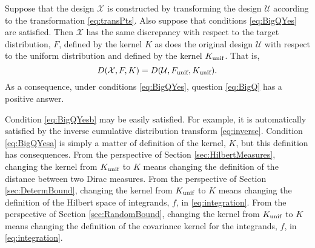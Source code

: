 \documentclass[graybox]{svmult}
\newcommand{\Udes}{\mathcal{U}}
\newcommand{\Xdes}{\mathcal{X}}
\newcommand{\unif}{\textup{unif}}
\begin{document}
\begin{theorem}
Suppose that the design $\Xdes$ is constructed by transforming the design $\Udes$ according to the transformation \eqref{eq:transPts}.  Also suppose that conditions \eqref{eq:BigQYes} are satisfied.  Then $\Xdes$ has the same discrepancy with respect to the target distribution, $F$, defined by the kernel $K$ as does the original design $\Udes$ with respect to the uniform distribution and defined by the kernel $K_\unif$.  That is,
\begin{equation*}
     D(\Xdes,F,K) = D(\Udes,F_{\unif},K_\unif).
\end{equation*}
As a consequence, under conditions \eqref{eq:BigQYes}, question \eqref{eq:BigQ} has a positive answer.
\end{theorem}

Condition \eqref{eq:BigQYesb} may be easily satisfied.  For example, it is automatically satisfied by the inverse cumulative distribution transform \eqref{eq:inverse}.  Condition \eqref{eq:BigQYesa} is simply a matter of definition of the kernel, $K$, but this definition has consequences.  From the perspective of Section \ref{sec:HilbertMeasures}, changing the kernel from $K_\unif$ to $K$ means changing the definition of the distance between two Dirac measures.  From the perspective of Section \ref{sec:DetermBound}, changing the kernel from $K_\unif$ to $K$ means changing the definition of the Hilbert space of integrands, $f$, in \eqref{eq:integration}.   From the perspective of Section \ref{sec:RandomBound}, changing the kernel from $K_\unif$ to $K$ means changing the definition of the covariance kernel for the integrands, $f$, in \eqref{eq:integration}.
\end{document}
